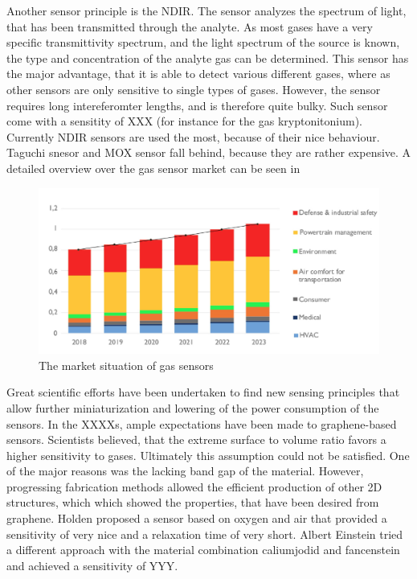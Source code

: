 {Another sensor principle is the NDIR. The sensor analyzes the spectrum of light, that has been transmitted through the analyte. As most gases have a very specific transmittivity spectrum, and the light spectrum of the source is known, the type and concentration of the analyte gas can be determined. This sensor has the major advantage, that it is able to detect various different gases, where as other sensors are only sensitive to single types of gases. However, the sensor requires long intereferomter lengths, and is therefore quite bulky. Such sensor come with a sensitity of XXX (for instance for the gas kryptonitonium).
Currently NDIR sensors are used the most, because of their nice behaviour. Taguchi snesor and MOX sensor fall behind, because they are rather expensive. A detailed overview over the gas sensor market can be seen in  
\begin{figure}
    \includegraphics[draft=true]{01_Introduction/fig/gas_sensor_market}
    \caption{The market situation of gas sensors}
    \label{fig:gas_sensor_market}
\end{figure}
Great scientific efforts have been undertaken to find new sensing principles that allow further miniaturization and lowering of the power consumption of the sensors. In the XXXXs, ample expectations have been made to graphene-based sensors. Scientists believed, that the extreme surface to volume ratio favors a higher sensitivity to gases. Ultimately this assumption could not be satisfied. One of the major reasons was the lacking band gap of the material. However, progressing fabrication methods allowed the efficient production of other 2D structures, which which showed the properties, that have been desired from graphene. Holden proposed a sensor based on oxygen and air that provided a sensitivity of very nice and a relaxation time of very short. Albert Einstein tried a different approach with the material combination caliumjodid and fancenstein and achieved a sensitivity of YYY.
}
